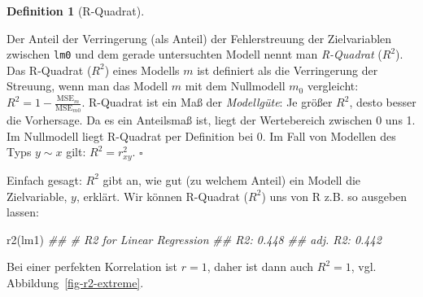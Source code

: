 \documentclass[
  letterpaper,
  oneside,
  open=any]{scrbook}
\newenvironment{Shaded}{\begin{snugshade}}{\end{snugshade}}
\newcommand{\DocumentationTok}[1]{\textcolor[rgb]{0.37,0.37,0.37}{\textit{#1}}}
\newcommand{\FunctionTok}[1]{\textcolor[rgb]{0.28,0.35,0.67}{#1}}
\newcommand{\NormalTok}[1]{\textcolor[rgb]{0.00,0.23,0.31}{#1}}
\theoremstyle{definition}
\theoremstyle{definition}
\theoremstyle{definition}
\newtheorem{definition}{Definition}[chapter]
\theoremstyle{remark}
\begin{document}
\begin{definition}[R-Quadrat]\protect\hypertarget{def-r2}{}\label{def-r2}

Der Anteil der Verringerung (als Anteil) der Fehlerstreuung der
Zielvariablen zwischen \texttt{lm0} und dem gerade untersuchten Modell
nennt man \emph{R-Quadrat} (\(R^2\)). Das R-Quadrat (\(R^2\)) eines
Modells \(m\) ist definiert als die Verringerung der Streuung, wenn man
das Modell \(m\) mit dem Nullmodell \(m_0\) vergleicht:
\(R^2 =1-  \frac{\text{MSE}_{m}}{\text{MSE}_{m0}}\). R-Quadrat ist ein
Maß der \emph{Modellgüte}: Je größer \(R^2\), desto besser die
Vorhersage. Da es ein Anteilsmaß ist, liegt der Wertebereich zwischen 0
uns 1. Im Nullmodell liegt R-Quadrat per Definition bei 0. Im Fall von
Modellen des Typs \(y\sim x\) gilt: \(R^2 = r_{xy}^2\). \(\square\)

\end{definition}

Einfach gesagt: \(R^2\) gibt an, wie gut (zu welchem Anteil) ein Modell
die Zielvariable, \(y\), erklärt. Wir können R-Quadrat (\(R^2\)) uns von
R z.B. so ausgeben lassen:

\begin{Shaded}
\begin{Highlighting}[]
\FunctionTok{r2}\NormalTok{(lm1)}
\DocumentationTok{\#\# \# R2 for Linear Regression}
\DocumentationTok{\#\#        R2: 0.448}
\DocumentationTok{\#\#   adj. R2: 0.442}
\end{Highlighting}
\end{Shaded}

Bei einer perfekten Korrelation ist \(r=1\), daher ist dann auch
\(R^2 = 1\), vgl. Abbildung~\ref{fig-r2-extreme}.
\end{document}
